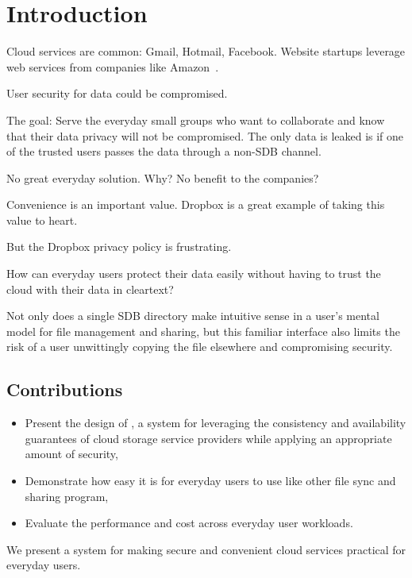 \section{Introduction}

Cloud services are common: Gmail, Hotmail, Facebook. Website startups leverage
web services from companies like Amazon~\cite{aws}.

User security for data could be compromised.

The goal: Serve the everyday small groups who want to collaborate and
know that their data privacy will not be compromised. The only data is
leaked is if one of the trusted users passes the data through a
non-SDB channel.

No great everyday solution. Why? No benefit to the companies?

Convenience is an important value. Dropbox is a great example of
taking this value to heart. 

But the Dropbox privacy policy is frustrating.

How can everyday users protect their data easily without having to
trust the cloud with their data in cleartext?

Not only does a single SDB directory make intuitive sense in a user's
mental model for file management and sharing, but this familiar
interface also limits the risk of a user unwittingly copying the file
elsewhere and compromising security.

\subsection*{Contributions}

\begin{itemize}
\item Present the design of \name, a system for leveraging the
  consistency and availability guarantees of cloud storage service
  providers while applying an appropriate amount of security,
\item Demonstrate how easy it is for everyday users to use \name like
  other file sync and sharing program,
\item Evaluate the performance and cost across everyday user
  workloads.
\end{itemize}

We present a system for making secure and convenient cloud services
practical for everyday users.
